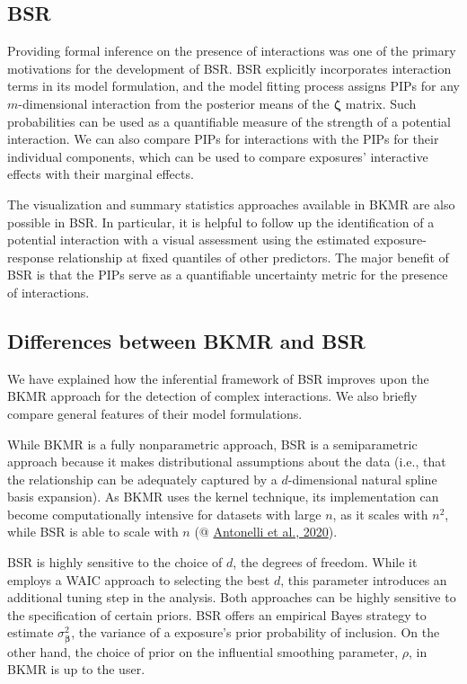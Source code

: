 \documentclass[12pt, twoside]{amherstthesis}
\begin{document}
\hypertarget{bsr-1}{%
\subsection{BSR}\label{bsr-1}}

Providing formal inference on the presence of interactions was one of the primary motivations for the development of BSR. BSR explicitly incorporates interaction terms in its model formulation, and the model fitting process assigns PIPs for any \(m\)-dimensional interaction from the posterior means of the \(\boldsymbol\zeta\) matrix. Such probabilities can be used as a quantifiable measure of the strength of a potential interaction. We can also compare PIPs for interactions with the PIPs for their individual components, which can be used to compare exposures' interactive effects with their marginal effects.

The visualization and summary statistics approaches available in BKMR are also possible in BSR. In particular, it is helpful to follow up the identification of a potential interaction with a visual assessment using the estimated exposure-response relationship at fixed quantiles of other predictors. The major benefit of BSR is that the PIPs serve as a quantifiable uncertainty metric for the presence of interactions.

\hypertarget{differences-between-bkmr-and-bsr}{%
\subsection{Differences between BKMR and BSR}\label{differences-between-bkmr-and-bsr}}

We have explained how the inferential framework of BSR improves upon the BKMR approach for the detection of complex interactions. We also briefly compare general features of their model formulations.

While BKMR is a fully nonparametric approach, BSR is a semiparametric approach because it makes distributional assumptions about the data (i.e., that the relationship can be adequately captured by a \(d\)-dimensional natural spline basis expansion). As BKMR uses the kernel technique, its implementation can become computationally intensive for datasets with large \(n\), as it scales with \(n^2\), while BSR is able to scale with \(n\) (@ \protect\hyperlink{ref-antonelli_estimating_2020}{Antonelli et al., 2020}).

BSR is highly sensitive to the choice of \(d\), the degrees of freedom. While it employs a WAIC approach to selecting the best \(d\), this parameter introduces an additional tuning step in the analysis. Both approaches can be highly sensitive to the specification of certain priors. BSR offers an empirical Bayes strategy to estimate \(\sigma^2_{\boldsymbol\beta}\), the variance of a exposure's prior probability of inclusion. On the other hand, the choice of prior on the influential smoothing parameter, \(\rho\), in BKMR is up to the user.
\end{document}
